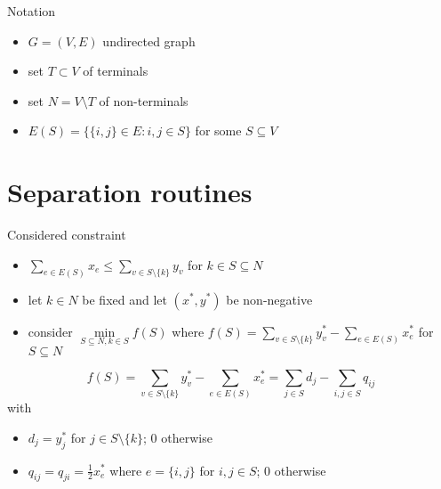 \documentclass{beamer}
\begin{document}
\begin{frame}{Notation}
  \begin{itemize}
  \item $G = (V,E)$ undirected graph
  \item set $T \subset V$ of terminals 
  \item set $N = V \setminus T$ of non-terminals
  \item $E(S) = \{\{i,j\} \in E: i,j \in S\}$ for some $S \subseteq V$
  \end{itemize}
\end{frame}

\section{Separation routines}
\begin{frame}{Considered constraint}
  \begin{itemize}
  \item $\sum\limits_{e \in E(S)} x_e \leq \sum\limits_{v \in S
    \setminus \{k\}} y_v$ for $k \in S \subseteq N$
  \item let $k \in N$ be fixed and let $(x^*,y^*)$ be non-negative
  \item consider $\min\limits_{S \subseteq N, k \in S} f(S)$ where
    $f(S) = \sum\limits_{v \in S \setminus \{k\}} y^*_v -
    \sum\limits_{e \in E(S)} x^*_e$ for $S \subseteq N$
  \end{itemize}
\end{frame}

\begin{frame}
  \begin{equation*}
    f(S) = \sum\limits_{v \in S \setminus \{k\}} y^*_v -
    \sum\limits_{e \in E(S)} x^*_e = \sum\limits_{j \in S} d_j -
    \sum\limits_{i,j \in S} q_{ij}
  \end{equation*}
  with
  \begin{itemize}
    \item $d_j = y^*_j$ for $j \in S \setminus \{k\}$; 0 otherwise
    \item $q_{ij} = q_{ji} = \frac{1}{2} x^*_e$ where $e = \{i,j\}$
      for $i,j \in S$; 0 otherwise
  \end{itemize}
\end{frame}
\end{document}
